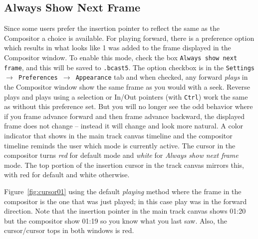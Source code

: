 \subsection{Always Show Next Frame}%
\label{sub:always_show_next_frame}

Since some users prefer the insertion pointer to reflect the same as the Compositor a choice is available.  For playing forward, there is a preference option which results in what looks like 1 was added to the frame displayed in the Compositor window.  To enable this mode, check the box \texttt{Always show next frame}, and this will be saved to \texttt{.bcast5}.  The option checkbox is in the \texttt{Settings $\rightarrow$ Preferences $\rightarrow$ Appearance} tab and when checked, any forward \textit{plays} in the Compositor window show the same frame as you would with a seek.  Reverse plays and plays using a selection or In/Out pointers (with \texttt{Ctrl}) work the same as without this preference set.  But you will no longer see the odd behavior where if you frame advance forward and then frame advance backward, the displayed frame does not change -- instead it will change and look more natural.
A color indicator that shows in the main track canvas timeline and the compositor timeline reminds the user which mode is currently active.  The cursor in the compositor turns \textit{red} for default mode and \textit{white} for \textit{Always show next frame} mode.  The top portion of the insertion cursor in the track canvas mirrors this, with red for default and white otherwise.

Figure~\ref{fig:cursor01} using the default \textit{playing} method where the frame in the compositor is the one that was just played; in this case play was in the forward direction.  Note that the insertion pointer in the main track canvas shows 01:20 but the compositor show 01:19 so you know what you last saw.  Also, the cursor/cursor tops in both windows is red.


